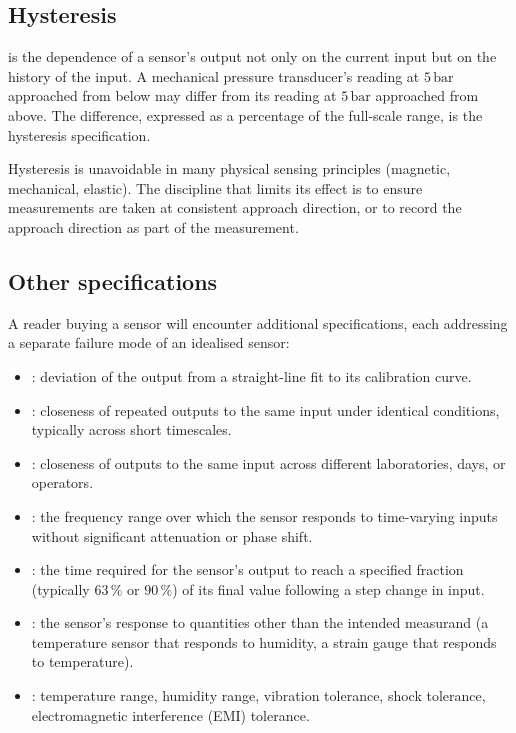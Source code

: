 \subsection{Hysteresis}

 is the dependence of a sensor's output not
only on the current input but on the history of the input. A
mechanical pressure transducer's reading at $5 \,\si{\bar}$
approached from below may differ from its reading at $5 \,\si{\bar}$
approached from above. The difference, expressed as a percentage of
the full-scale range, is the hysteresis specification.

Hysteresis is unavoidable in many physical sensing principles
(magnetic, mechanical, elastic). The discipline that limits its
effect is to ensure measurements are taken at consistent approach
direction, or to record the approach direction as part of the
measurement.

\subsection{Other specifications}

A reader buying a sensor will encounter additional specifications,
each addressing a separate failure mode of an idealised sensor:

\begin{itemize}[leftmargin=*]
  \item {}: deviation of the output from a
    straight-line fit to its calibration curve.
  \item {}: closeness of repeated outputs to
    the same input under identical conditions, typically across
    short timescales.
  \item {}: closeness of outputs to the same
    input across different laboratories, days, or operators.
  \item {}: the frequency range over which the
    sensor responds to time-varying inputs without significant
    attenuation or phase shift.
  \item {}: the time required for the sensor's
    output to reach a specified fraction (typically $63\,\%$ or
    $90\,\%$) of its final value following a step change in input.
  \item {}: the sensor's response to
    quantities other than the intended measurand (a temperature
    sensor that responds to humidity, a strain gauge that responds
    to temperature).
  \item {}: temperature range, humidity
    range, vibration tolerance, shock tolerance, electromagnetic
    interference (EMI) tolerance.
\end{itemize}

